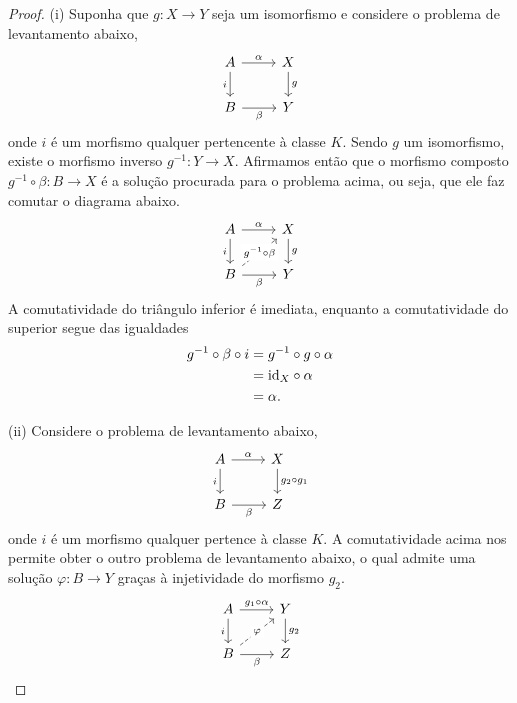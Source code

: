 \begin{proof}
  (i) Suponha que $g: X \to Y$ seja um isomorfismo e considere o problema de levantamento abaixo,
  \begin{displaymath}
    \begin{tikzcd}
      A
      \arrow[r, "\alpha"]
      \arrow[d, "i" swap]
      & X
      \arrow[d, "g"]
      \\ B
      \arrow[r, "\beta" swap]
      & Y
    \end{tikzcd}
  \end{displaymath}
  onde $i$ é um morfismo qualquer pertencente à classe $K$.
  Sendo $g$ um isomorfismo, existe o morfismo inverso $g^{-1}: Y \to X$.
  Afirmamos então que o morfismo composto $g^{-1} \circ \beta: B \to X$ é a solução procurada para o problema acima, ou seja, que ele faz comutar o diagrama abaixo.
  \begin{displaymath}
    \begin{tikzcd}
      A
      \arrow[r, "\alpha"]
      \arrow[d, "i" swap]
      & X
      \arrow[d, "g"]
      \\ B
      \arrow[r, "\beta" swap]
      \arrow[ru, dashed, "g^{-1} \circ \beta" description]
      & Y
    \end{tikzcd}
  \end{displaymath}
  A comutatividade do triângulo inferior é imediata, enquanto a comutatividade do superior segue das igualdades
  \begin{align*}
    g^{-1} \circ \beta \circ i
    & = g^{-1} \circ g \circ \alpha \\
    & = \mathrm{id}_X \circ \alpha \\
    & = \alpha.
  \end{align*}

  \smallskip
  (ii) Considere o problema de levantamento abaixo,
  \begin{displaymath}
    \begin{tikzcd}
      A
      \arrow[r, "\alpha"]
      \arrow[d, "i" swap]
      & X
      \arrow[d, "g_2 \circ g_1"]
      \\ B
      \arrow[r, "\beta" swap]
      & Z
    \end{tikzcd}
  \end{displaymath}
  onde $i$ é um morfismo qualquer pertence à classe $K$.
  A comutatividade acima nos permite obter o outro problema de levantamento abaixo, o qual admite uma solução $\varphi: B \to Y$ graças à injetividade do morfismo $g_2$.
  \begin{equation}\label{eq:comp_inj_diag_2}
    \begin{tikzcd}
      A
      \arrow[r, "g_1 \circ \alpha"]
      \arrow[d, "i" swap]
      & Y
      \arrow[d, "g_2"]
      \\ B
      \arrow[r, "\beta" swap]
      \arrow[ru, dashed, "\varphi" description]
      & Z
    \end{tikzcd}
  \end{equation}


\end{proof}

